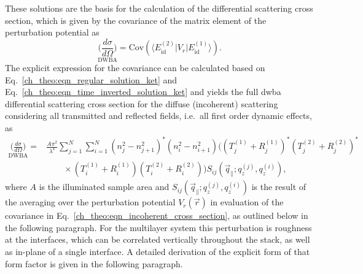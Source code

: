 These solutions are the basis for the calculation of the differential scattering cross section, which is given by the covariance of the matrix element of the perturbation potential \cite{pietsch_high-resolution_2004} as
\begin{equation}
        \underset{\text{DWBA}}{\Big(\frac{d \sigma}{d \Omega}\Big)}= \text{Cov}(\langle E_{\text{id}}^{(2)}| V_r|E_{\text{id}}^{(1)}\rangle)\text{.} \label{ch_theo:eqn_incoherent_cross_section} 
\end{equation}
The explicit expression for the covariance can be calculated based on Eq.~\eqref{ch_theo:eqn_regular_solution_ket} and Eq.~\eqref{ch_theo:eqn_time_inverted_solution_ket} and yields the full \gls{dwba} differential scattering cross section for the diffuse (incoherent) scattering considering all transmitted and reflected fields, i.e.~all first order dynamic effects, as
\begin{align}
        {\underset{\text{DWBA}}{\Big(\frac{d \sigma}{d \Omega}\Big)}} = &\frac{A \pi^2}{\lambda^4}\sum \limits_{j=1}^{N}\sum \limits_{i=1}^{N} (n_j^2 - n_{j+1}^2)^* (n_i^2 - n_{i+1}^2)\Big( (T^{(1)}_j + R^{(1)}_j)^* (T^{(2)}_j + R^{(2)}_j)^* \nonumber \\ &\qquad\times(T^{(1)}_i + R^{(1)}_i) (T^{(2)}_i + R^{(2)}_i) \Big)  S_{ij}(\vec{q}_\parallel; q_z^{(j)}, q_z^{(i)}) \text{,} \label{ch_theo:eqn_full_dwba_expression}
\end{align}
where $A$ is the illuminated sample area and $S_{ij}(\vec{q}_\parallel; q_z^{(j)}, q_z^{(i)})$ is the result of the averaging over the perturbation potential $V_r(\vec{r})$ in evaluation of the covariance in Eq.~\eqref{ch_theo:eqn_incoherent_cross_section}, as outlined below in the following paragraph. For the multilayer system this perturbation is roughness at the interfaces, which can be correlated vertically throughout the stack, as well as in-plane of a single interface. A detailed derivation of the explicit form of that form factor is given in the following paragraph.


